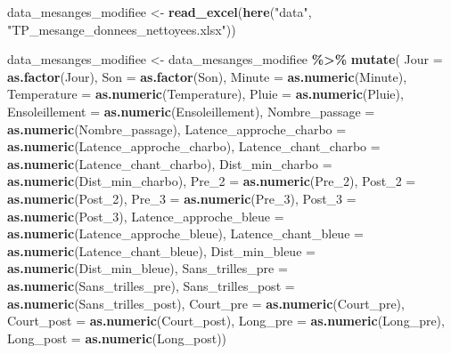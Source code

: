 \documentclass[
  french,
]{article}
\newenvironment{Shaded}{\begin{snugshade}}{\end{snugshade}}
\newcommand{\AttributeTok}[1]{\textcolor[rgb]{0.13,0.29,0.53}{#1}}
\newcommand{\FunctionTok}[1]{\textcolor[rgb]{0.13,0.29,0.53}{\textbf{#1}}}
\newcommand{\NormalTok}[1]{#1}
\newcommand{\OtherTok}[1]{\textcolor[rgb]{0.56,0.35,0.01}{#1}}
\newcommand{\SpecialCharTok}[1]{\textcolor[rgb]{0.81,0.36,0.00}{\textbf{#1}}}
\newcommand{\StringTok}[1]{\textcolor[rgb]{0.31,0.60,0.02}{#1}}
\begin{document}
\begin{Shaded}
\begin{Highlighting}[]
\NormalTok{data\_mesanges\_modifiee }\OtherTok{\textless{}{-}} \FunctionTok{read\_excel}\NormalTok{(}\FunctionTok{here}\NormalTok{(}\StringTok{"data"}\NormalTok{, }\StringTok{"TP\_mesange\_donnees\_nettoyees.xlsx"}\NormalTok{))}

\NormalTok{data\_mesanges\_modifiee }\OtherTok{\textless{}{-}}\NormalTok{ data\_mesanges\_modifiee }\SpecialCharTok{\%\textgreater{}\%} \FunctionTok{mutate}\NormalTok{(}
  \AttributeTok{Jour =} \FunctionTok{as.factor}\NormalTok{(Jour),}
  \AttributeTok{Son =} \FunctionTok{as.factor}\NormalTok{(Son),}
  \AttributeTok{Minute =} \FunctionTok{as.numeric}\NormalTok{(Minute), }
  \AttributeTok{Temperature =} \FunctionTok{as.numeric}\NormalTok{(Temperature), }
  \AttributeTok{Pluie =} \FunctionTok{as.numeric}\NormalTok{(Pluie), }
  \AttributeTok{Ensoleillement =} \FunctionTok{as.numeric}\NormalTok{(Ensoleillement), }
  \AttributeTok{Nombre\_passage =} \FunctionTok{as.numeric}\NormalTok{(Nombre\_passage), }
  \AttributeTok{Latence\_approche\_charbo =} \FunctionTok{as.numeric}\NormalTok{(Latence\_approche\_charbo), }
  \AttributeTok{Latence\_chant\_charbo =} \FunctionTok{as.numeric}\NormalTok{(Latence\_chant\_charbo), }
  \AttributeTok{Dist\_min\_charbo =} \FunctionTok{as.numeric}\NormalTok{(Dist\_min\_charbo), }
  \AttributeTok{Pre\_2 =} \FunctionTok{as.numeric}\NormalTok{(Pre\_2), }
  \AttributeTok{Post\_2 =} \FunctionTok{as.numeric}\NormalTok{(Post\_2), }
  \AttributeTok{Pre\_3 =} \FunctionTok{as.numeric}\NormalTok{(Pre\_3), }
  \AttributeTok{Post\_3 =} \FunctionTok{as.numeric}\NormalTok{(Post\_3), }
  \AttributeTok{Latence\_approche\_bleue =} \FunctionTok{as.numeric}\NormalTok{(Latence\_approche\_bleue), }
  \AttributeTok{Latence\_chant\_bleue =} \FunctionTok{as.numeric}\NormalTok{(Latence\_chant\_bleue), }
  \AttributeTok{Dist\_min\_bleue =} \FunctionTok{as.numeric}\NormalTok{(Dist\_min\_bleue), }
  \AttributeTok{Sans\_trilles\_pre =} \FunctionTok{as.numeric}\NormalTok{(Sans\_trilles\_pre), }
  \AttributeTok{Sans\_trilles\_post =} \FunctionTok{as.numeric}\NormalTok{(Sans\_trilles\_post), }
  \AttributeTok{Court\_pre =} \FunctionTok{as.numeric}\NormalTok{(Court\_pre), }
  \AttributeTok{Court\_post =} \FunctionTok{as.numeric}\NormalTok{(Court\_post), }
  \AttributeTok{Long\_pre =} \FunctionTok{as.numeric}\NormalTok{(Long\_pre), }
  \AttributeTok{Long\_post =} \FunctionTok{as.numeric}\NormalTok{(Long\_post))}
\end{Highlighting}
\end{Shaded}
\end{document}
